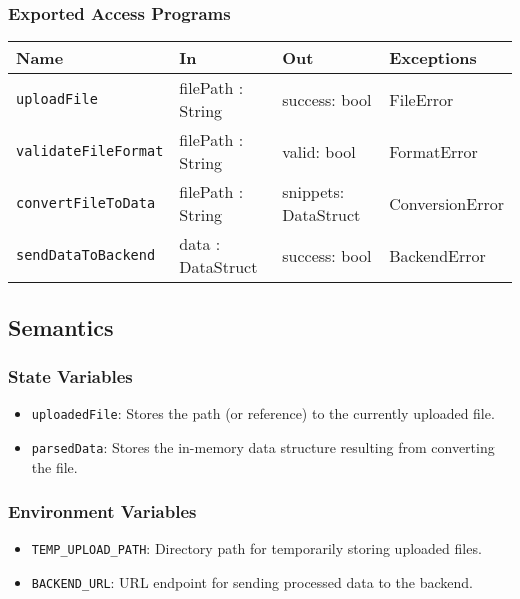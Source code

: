 \documentclass[12pt, titlepage]{article}
\begin{document}
\subsubsection{Exported Access Programs}

\begin{center}
\begin{tabular}{p{5cm} p{3.5cm} p{3.5cm} p{2cm}}
\hline
\textbf{Name} & \textbf{In} & \textbf{Out} & \textbf{Exceptions} \\
\hline
\texttt{uploadFile} & filePath : String & success: bool & FileError \\
\texttt{validateFileFormat} & filePath : String & valid: bool & FormatError \\
\texttt{convertFileToData} & filePath : String & snippets: DataStruct & ConversionError \\
\texttt{sendDataToBackend} & data : DataStruct & success: bool & BackendError \\
\hline
\end{tabular}
\end{center}

\subsection{Semantics}

\subsubsection{State Variables}


\begin{itemize}
    \item \texttt{uploadedFile}: Stores the path (or reference) to the currently uploaded file.
    \item \texttt{parsedData}: Stores the in-memory data structure resulting from converting the file.
\end{itemize}

\subsubsection{Environment Variables}

\begin{itemize}
    \item \texttt{TEMP\_UPLOAD\_PATH}: Directory path for temporarily storing uploaded files.
    \item \texttt{BACKEND\_URL}: URL endpoint for sending processed data to the backend.
\end{itemize}
\end{document}
